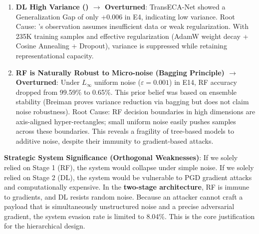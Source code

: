 \documentclass[sigconf]{acmart}
\begin{document}
\begin{enumerate}
\item \textbf{DL High Variance (\cite{5}) $\to$ Overturned}: TransECA-Net showed a Generalization Gap of only +0.006 in E4, indicating low variance. Root Cause: \cite{3}'s observation assumes insufficient data or weak regularization. With 235K training samples and effective regularization (AdamW weight decay + Cosine Annealing + Dropout), variance is suppressed while retaining representational capacity.

\item \textbf{RF is Naturally Robust to Micro-noise (Bagging Principle) $\to$ Overturned}: Under $L_\infty$ uniform noise ($\varepsilon = 0.001$) in E14, RF accuracy dropped from 99.59\% to 0.65\%. This prior belief was based on ensemble stability (Breiman \cite{11} proves variance reduction via bagging but does not claim noise robustness). Root Cause: RF decision boundaries in high dimensions are axis-aligned hyper-rectangles; small uniform noise easily pushes samples across these boundaries. This reveals a fragility of tree-based models to additive noise, despite their immunity to gradient-based attacks.
\end{enumerate}

\textbf{Strategic System Significance (Orthogonal Weaknesses)}: If we solely relied on Stage 1 (RF), the system would collapse under simple noise. If we solely relied on Stage 2 (DL), the system would be vulnerable to PGD gradient attacks and computationally expensive. In the \textbf{two-stage architecture}, RF is immune to gradients, and DL resists random noise. Because an attacker cannot craft a payload that is simultaneously unstructured noise and a precise adversarial gradient, the system evasion rate is limited to 8.04\%. This is the core justification for the hierarchical design.
\end{document}
